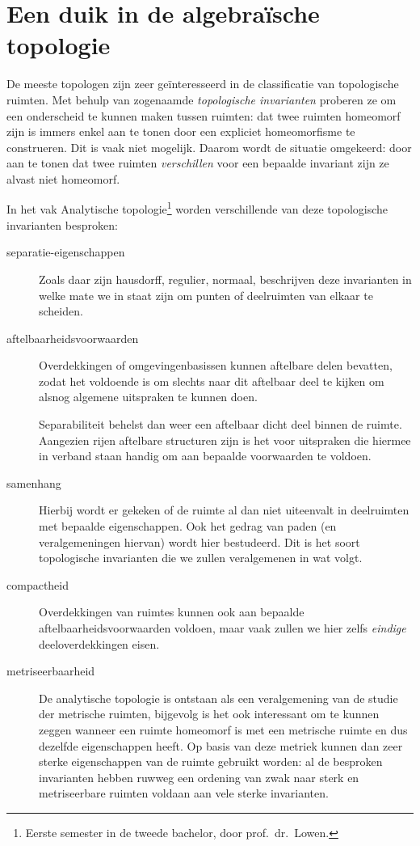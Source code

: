 \documentclass[a4paper,11pt,openany,oneside,article]{memoir}
\begin{document}
\section{Een duik in de algebra\"ische topologie}
De meeste topologen zijn zeer ge\"interesseerd in de classificatie van topologische ruimten. Met behulp van zogenaamde \emph{topologische invarianten} proberen ze om een onderscheid te kunnen maken tussen ruimten: dat twee ruimten homeomorf zijn is immers enkel aan te tonen door een expliciet homeomorfisme te construeren. Dit is vaak niet mogelijk. Daarom wordt de situatie omgekeerd: door aan te tonen dat twee ruimten \emph{verschillen} voor een bepaalde invariant zijn ze alvast niet homeomorf.

In het vak Analytische topologie\footnote{Eerste semester in de tweede bachelor, door prof.~dr.~Lowen.} worden verschillende van deze topologische invarianten besproken:
\begin{description}
  \item[separatie-eigenschappen] Zoals daar zijn hausdorff, regulier, normaal, beschrijven deze invarianten in welke mate we in staat zijn om punten of deelruimten van elkaar te scheiden. 

  \item[aftelbaarheidsvoorwaarden] Overdekkingen of omgevingenbasissen kunnen aftelbare delen bevatten, zodat het voldoende is om slechts naar dit aftelbaar deel te kijken om alsnog algemene uitspraken te kunnen doen.
    
    Separabiliteit behelst dan weer een aftelbaar dicht deel binnen de ruimte. Aangezien rijen aftelbare structuren zijn is het voor uitspraken die hiermee in verband staan handig om aan bepaalde voorwaarden te voldoen.
    
  \item[samenhang] Hierbij wordt er gekeken of de ruimte al dan niet uiteenvalt in deelruimten met bepaalde eigenschappen. Ook het gedrag van paden (en veralgemeningen hiervan) wordt hier bestudeerd. Dit is het soort topologische invarianten die we zullen veralgemenen in wat volgt.

  \item[compactheid] Overdekkingen van ruimtes kunnen ook aan bepaalde aftelbaarheidsvoorwaarden voldoen, maar vaak zullen we hier zelfs \emph{eindige} deeloverdekkingen eisen. 

  \item[metriseerbaarheid] De analytische topologie is ontstaan als een veralgemening van de studie der metrische ruimten, bijgevolg is het ook interessant om te kunnen zeggen wanneer een ruimte homeomorf is met een metrische ruimte en dus dezelfde eigenschappen heeft. Op basis van deze metriek kunnen dan zeer sterke eigenschappen van de ruimte gebruikt worden: al de besproken invarianten hebben ruwweg een ordening van zwak naar sterk en metriseerbare ruimten voldaan aan vele sterke invarianten.
\end{description}
\end{document}
